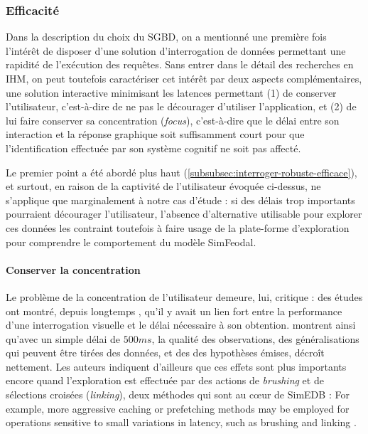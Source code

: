 		\subsubsection{Efficacité}

		Dans la description du choix du SGBD, on a mentionné une première fois l'intérêt de disposer d'une solution d'interrogation de données permettant une rapidité de l'exécution des requêtes.
		Sans entrer dans le détail des recherches en IHM, on peut toutefois caractériser cet intérêt par deux aspects complémentaires, une solution interactive minimisant les latences permettant (1) de conserver l'utilisateur, c'est-à-dire de ne pas le décourager d'utiliser l'application, et (2) de lui faire conserver sa concentration (\textit{focus}), c'est-à-dire que le délai entre son interaction et la réponse graphique soit suffisamment court pour que l'identification effectuée par son système cognitif ne soit pas affecté.
		
		Le premier point a été abordé plus haut (\cref{subsubsec:interroger-robuste-efficace}), et surtout, en raison de la \og captivité\fg{} de l'utilisateur évoquée ci-dessus, ne s'applique que marginalement à notre cas d'étude : si des délais trop importants pourraient décourager l'utilisateur, l'absence d'alternative utilisable pour explorer ces données les contraint toutefois à faire usage de la plate-forme d'exploration pour comprendre le comportement du modèle SimFeodal.

		\paragraph*{Conserver la concentration}
		
		Le problème de la concentration de l'utilisateur demeure, lui, critique : des études ont montré, depuis longtemps \autocite{mackenzie_lag_1993}, qu'il y avait un lien fort entre la performance d'une interrogation visuelle et le délai nécessaire à son obtention.
		\cite[8]{liu_effects_2014} montrent ainsi qu'avec un simple délai de $500ms$, la qualité des observations, des généralisations qui peuvent être tirées des données, et des des hypothèses émises, décroît nettement. Les auteurs indiquent d'ailleurs que ces effets sont plus importants encore quand l'exploration est effectuée par des actions de \textit{brushing} et de sélections croisées (\textit{linking}), deux méthodes qui sont au cœur de SimEDB : \og For example, more aggressive caching or prefetching methods may be employed for operations sensitive to small variations in latency, such as brushing and linking \fg{}\autocite[9]{liu_effects_2014}.
		
